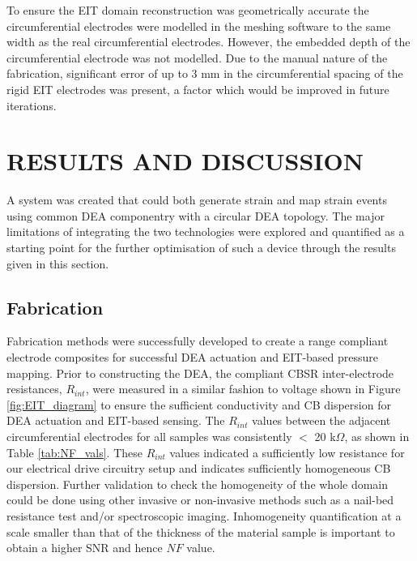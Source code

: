  	To ensure the EIT domain reconstruction was geometrically accurate the circumferential electrodes were modelled in the meshing software to the same width as the real circumferential electrodes. However, the embedded depth of the circumferential electrode was not modelled. Due to the manual nature of the fabrication, significant error of up to 3 mm in the circumferential spacing of the rigid EIT electrodes was present, a factor which would be improved in future iterations.
	
	
	
	\section{RESULTS AND DISCUSSION} %
	\label{sec:results_n_discu}
	A system was created that could both generate strain and map strain events using common DEA componentry with a circular DEA topology. The major limitations of integrating the two technologies were explored and quantified as a starting point for the further optimisation of such a device through the results given in this section.
 
	\subsection{Fabrication}
	\label{subsec:fab_results}
	Fabrication methods were successfully developed to create a range compliant electrode composites for successful DEA actuation and EIT-based pressure mapping. Prior to constructing the DEA, the compliant CBSR inter-electrode resistances, $R_{int}$, were measured  in a similar fashion to voltage shown in Figure \ref{fig:EIT_diagram} to ensure the sufficient conductivity and CB dispersion for DEA actuation and EIT-based sensing. The $R_{int}$ values between the adjacent circumferential electrodes for all samples was consistently $<$ 20 k$\Omega$, as shown in Table \ref{tab:NF_vals}. These $R_{int}$ values indicated a sufficiently low resistance for our electrical drive circuitry setup and indicates sufficiently homogeneous CB dispersion. Further validation to check the homogeneity of the whole domain could be done using other invasive or non-invasive methods such as a nail-bed resistance test and/or spectroscopic imaging. Inhomogeneity quantification at a scale smaller than that of the thickness of the material sample is important to obtain a higher SNR and hence $N\!F$ value.


